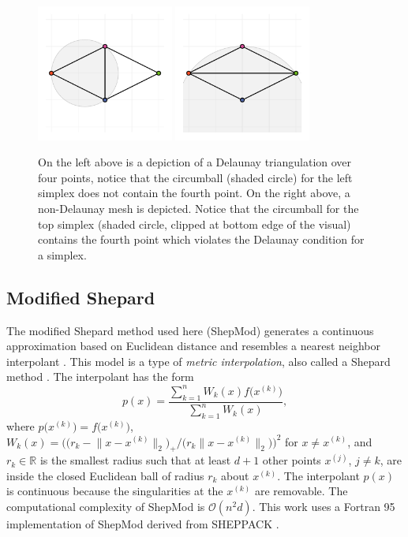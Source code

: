\begin{figure}
  \centering
  \includegraphics[width=0.4\textwidth,]{Figures/NA/example_delaunay.pdf}
  \includegraphics[width=0.4\textwidth,]{Figures/NA/example_not_delaunay.pdf}
  \caption{On the left above is a depiction of a Delaunay
    triangulation over four points, notice that the circumball (shaded
    circle) for the left simplex does not contain the fourth point.
    On the right above, a non-Delaunay mesh is depicted. Notice that
    the circumball for the top simplex (shaded circle, clipped at
    bottom edge of the visual) contains the fourth point which
    violates the Delaunay condition for a simplex.
  \vspace{-.1cm}}
  \label{fig:delaunay}
\end{figure}


\subsection{Modified Shepard}
\label{sec:modified-shepard}

The modified Shepard method used here (ShepMod) generates a continuous
approximation based on Euclidean distance and resembles a nearest
neighbor interpolant \cite{cover1967nearest}. This model is a type of
\textit{metric interpolation}, also called a Shepard method
\cite{gordon1978shepard,shepard1968two}. The interpolant has the form
 $$ p(x) = \frac{\sum\limits_{k=1}^{n}W_k(x)f\bigl(x^{(k)}\bigr)}
     {\sum\limits_{k=1}^{n}W_k(x)} ,$$ where
     $p\bigl(x^{(k)}\bigr) = f\bigl(x^{(k)}\bigr)$, $W_k(x) =
       \bigl(\bigl(r_k - \bigl\|x - x^{(k)}\bigr\|_2\bigr)_+ \big/
       \bigl( r_k \bigl\|x - x^{(k)}\bigr\|_2 \bigr)\bigr)^2$ for $x
       \neq x^{(k)}$, and $r_k \in \mathbb{R}$ is the smallest
     radius such that at least $d+1$ other points $x^{(j)}$, $j \not =
     k$, are inside the closed Euclidean ball of radius $r_k$ about
     $x^{(k)}$. The interpolant $p(x)$ is continuous because
       the singularities at the $x^{(k)}$ are removable. The
     computational complexity of ShepMod is $\mathcal{O}(n^2d)$. This
     work uses a Fortran 95 implementation of ShepMod derived from
     SHEPPACK \cite{thacker2010algorithm}.

